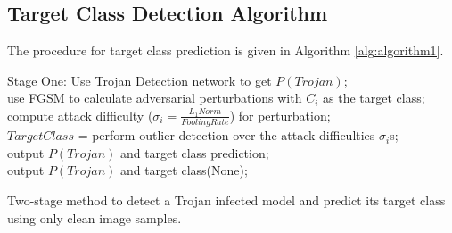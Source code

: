 \documentclass{article}
\begin{document}
\subsection*{Target Class Detection Algorithm}
The procedure for target class prediction is given in Algorithm \ref{alg:algorithm1}.

\begin{algorithm}[H]
Stage One: Use Trojan Detection network to get $P(Trojan)$; \\
    {
        {
            use FGSM to calculate adversarial perturbations with $C_i$ as the target class;\\
            compute attack difficulty ($\sigma_i = \frac{L_{1}{Norm}}{Fooling Rate}$) for perturbation;\\
        }
        $TargetClass$ = perform outlier detection over the attack difficulties $\sigma_i$s;\\
        output $P(Trojan)$ and target class prediction;\\
    }
    {
        output $P(Trojan)$ and target class(None);\\
    }
 
 \caption{Two-stage method to detect a Trojan infected model and predict its target class using only clean image samples.}
 \label{alg:algorithm1}
\end{algorithm}
\end{document}
